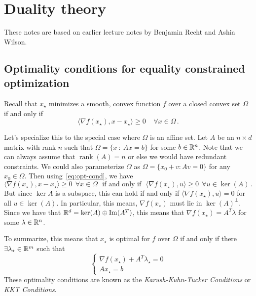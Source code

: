 \section{Duality theory}

These notes are based on earlier lecture notes by Benjamin Recht and Ashia
Wilson.

\subsection{Optimality conditions for equality constrained optimization}

Recall that $x_\star$ minimizes a smooth, convex function $f$ over a closed convex set $\Omega$ if and only if 
 \begin{equation}\label{eq:opt-cond}
  \langle \nabla f(x_\star), x - x_\star \rangle \geq 0 \;\;\;\; \forall x \in \Omega\,.
 \end{equation}

Let's specialize this to the special case where $\Omega$ is an affine set.  Let $A$ be an $n\times d$ matrix with rank $n$ such that $\Omega =\{x~:~Ax=b\}$ for some $b\in \mathbb{R}^n$.  Note that we can always assume that $\operatorname{rank}(A) = n$ or else we would have redundant constraints. We could also parameterize $\Omega$ as  $\Omega = \{x_0 + v : Av= 0\}$ for any $x_0\in \Omega$.  Then using~\eqref{eq:opt-cond}, we have
  \begin{equation*} 
  \langle \nabla f(x_\star), x - x_\star \rangle \geq 0  ~~\forall x \in \Omega~~~\mbox{if and only if}~~~
    \langle \nabla f(x_\star), u \rangle \geq 0 ~~\forall u \in \operatorname{ker}(A)\,.
    \end{equation*}
But since $\operatorname{ker}{A}$ is a subspace, this can hold if and only if  $\langle \nabla f(x_\star), u \rangle = 0$ for all $u \in \operatorname{ker}(A)$.  In particular, this means, $\nabla f(x_\star)$ must lie in $\operatorname{ker}(A)^\perp$.  Since we have that $\mathbb{R}^d = \operatorname{ker}(A) \oplus \operatorname{Im}(A^T)$, this means that $\nabla f(x_\star) = A^T \lambda$ for some $\lambda \in \mathbb{R}^n$.

To summarize, this means that $x_\star$ is optimal for $f$ over $\Omega$ if and only if there $\exists \lambda_\star \in \mathbb{R}^m$ such that 
$$ \begin{cases}
   \nabla f(x_\star) + A^T \lambda_\star  = 0\\
  Ax_\star = b 
  \end{cases}$$
These optimality conditions are known as the \emph{Karush-Kuhn-Tucker Conditions} or \emph{KKT Conditions}.



